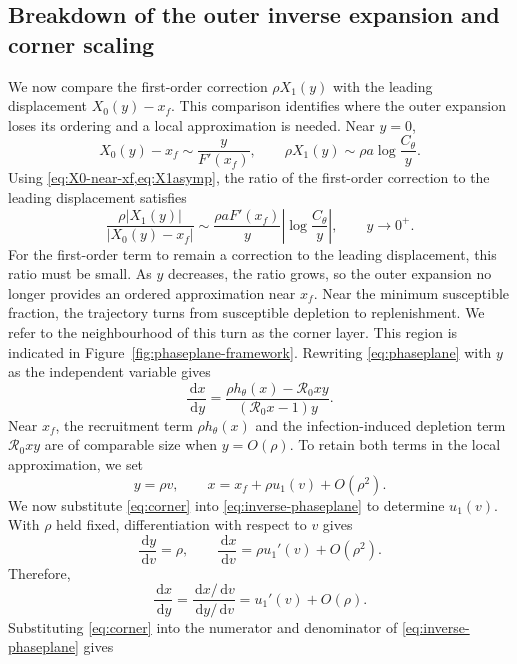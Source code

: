 \documentclass[11pt]{article}
\newcommand{\Rzero}{\mathcal R_0}
\newcommand{\rhoeps}{\rho}
\newcommand{\hth}{h_\theta}
\newcommand{\xf}{x_f}
\newcommand{\Cth}{C_\theta}
\newcommand{\dd}{\,\mathrm d}
\begin{document}
\subsection{Breakdown of the outer inverse expansion and corner scaling}
We now compare the first-order correction \(\rhoeps X_1(y)\) with the leading displacement \(X_0(y)-\xf\). This comparison identifies where the outer expansion loses its ordering and a local approximation is needed.
Near \(y=0\),
\[
X_0(y)-\xf\sim\frac{y}{F'(\xf)},
\qquad
\rhoeps X_1(y)\sim\rhoeps a\log\frac{\Cth}{y}.
\]
Using \cref{eq:X0-near-xf,eq:X1asymp}, the ratio of the first-order correction to the leading displacement satisfies
\begin{equation}
\frac{\rhoeps|X_1(y)|}{|X_0(y)-\xf|}
\sim\frac{\rhoeps aF'(\xf)}{y}\left|\log\frac{\Cth}{y}\right|,
\qquad y\to0^+.
\label{eq:outer-correction-ratio}
\end{equation}
For the first-order term to remain a correction to the leading displacement, this ratio must be small. As \(y\) decreases, the ratio grows, so the outer expansion no longer provides an ordered approximation near \(\xf\). Near the minimum susceptible fraction, the trajectory turns from susceptible depletion to replenishment. We refer to the neighbourhood of this turn as the corner layer. This region is indicated in Figure~\ref{fig:phaseplane-framework}.
Rewriting \cref{eq:phaseplane} with \(y\) as the independent variable gives
\begin{equation}
\frac{\dd x}{\dd y}=\frac{\rhoeps\hth(x)-\Rzero xy}{(\Rzero x-1)y}.
\label{eq:inverse-phaseplane}
\end{equation}
Near \(\xf\), the recruitment term \(\rhoeps\hth(x)\) and the infection-induced depletion term \(\Rzero xy\) are of comparable size when \(y=O(\rhoeps)\). To retain both terms in the local approximation, we set
\begin{equation}
y=\rhoeps v,
\qquad
x=\xf+\rhoeps u_1(v)+O(\rhoeps^2).
\label{eq:corner}
\end{equation}
We now substitute \cref{eq:corner} into \cref{eq:inverse-phaseplane} to determine \(u_1(v)\). With \(\rhoeps\) held fixed, differentiation with respect to \(v\) gives
\[
\frac{\dd y}{\dd v}=\rhoeps,
\qquad
\frac{\dd x}{\dd v}=\rhoeps u_1'(v)+O(\rhoeps^2).
\]
Therefore,
\begin{equation}
\frac{\dd x}{\dd y}=\frac{\dd x/\dd v}{\dd y/\dd v}
=u_1'(v)+O(\rhoeps).
\label{eq:corner-derivative}
\end{equation}
Substituting \cref{eq:corner} into the numerator and denominator of \cref{eq:inverse-phaseplane} gives
\end{document}
